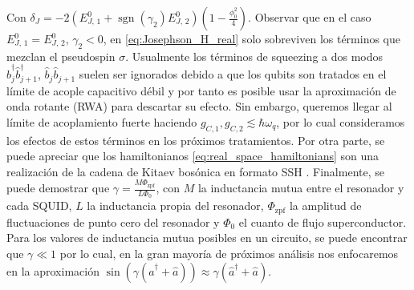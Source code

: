 Con $\delta_J = -2(E_{J,\,1}^0 + \operatorname{sgn}(\gamma_2)E_{J,\,2}^0)(1-\frac{\phi_0^2}{4})$. Observar que en el caso $E_{J,\,1}^0 = E_{J,\,2}^0$, $\gamma_2 < 0$, en \eqref{eq:Josephson_H_real} solo sobreviven los términos que mezclan el pseudospin $\sigma$. Usualmente los términos de squeezing a dos modos $\hat b^\dag_{j} \hat b^\dag_{j+1}$, $\hat b_{j} \hat b_{j+1}$ suelen ser ignorados debido a que los qubits son tratados en el límite de acople capacitivo débil y por tanto es posible usar la aproximación de onda rotante (RWA) para descartar su efecto. Sin embargo, queremos llegar al límite de acoplamiento fuerte haciendo $g_{C,1}, g_{C,2} \lesssim \hbar \omega_q$, por lo cual consideramos los efectos de estos términos en los próximos tratamientos. Por otra parte, se puede apreciar que los hamiltonianos \eqref{eq:real_space_hamiltonians} son una realización de la cadena de Kitaev bosónica en formato SSH \cite{McDonald2018}. Finalmente, se puede demostrar que $\gamma = \frac{M\Phi_{\text{zpf}}}{L\Phi_0}$, con $M$ la inductancia mutua entre el resonador y cada SQUID, $L$ la inductancia propia del resonador, $\Phi_{\text{zpf}}$ la amplitud de fluctuaciones de punto cero del resonador y $\Phi_0$ el cuanto de flujo superconductor. Para los valores de inductancia mutua posibles en un circuito, se puede encontrar que $\gamma  \ll 1$ por lo cual, en la gran mayoría de próximos análisis nos enfocaremos en la aproximación $\sin(\gamma(\hat a^\dag + \hat a)) \approx \gamma(\hat a^\dag + \hat a)$.